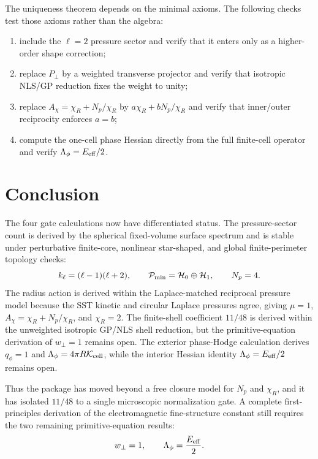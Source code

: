 \documentclass[11pt]{article}
\newcommand{\Eeff}{E_{\rm eff}}
\begin{document}
The uniqueness theorem depends on the minimal axioms.  The following checks
test those axioms rather than the algebra:
\begin{enumerate}
\item include the \(\ell=2\) pressure sector and verify that it enters only as a
higher-order shape correction;
\item replace \(P_\perp\) by a weighted transverse projector and verify that
isotropic NLS/GP reduction fixes the weight to unity;
\item replace \(A_\chi=\chi_R+N_p/\chi_R\) by
\(a\chi_R+bN_p/\chi_R\) and verify that inner/outer reciprocity enforces
\(a=b\);
\item compute the one-cell phase Hessian directly from the full finite-cell
operator and verify \(\Lambda_\phi=\Eeff/2\).
\end{enumerate}

\section{Conclusion}

The four gate calculations now have differentiated status.  The pressure-sector
count is derived by the spherical fixed-volume surface spectrum and is stable
under perturbative finite-core, nonlinear star-shaped, and global
finite-perimeter topology checks:
\[
  k_\ell=(\ell-1)(\ell+2),
  \qquad
  \mathcal P_{\rm min}=\mathcal H_0\oplus\mathcal H_1,
  \qquad
  N_p=4.
\]
The radius action is derived within the Laplace-matched reciprocal pressure
model because the SST kinetic and circular Laplace pressures agree, giving
\(\mu=1\), \(A_\chi=\chi_R+N_p/\chi_R\), and \(\chi_R=2\).  The finite-shell
coefficient \(11/48\) is derived within the unweighted isotropic GP/NLS shell
reduction, but the primitive-equation derivation of \(w_\perp=1\) remains open.
The exterior phase-Hodge calculation derives \(q_\phi=1\) and
\(\Lambda_\phi=4\pi R\mathcal K_{\rm cell}\), while the interior Hessian
identity \(\Lambda_\phi=E_{\rm eff}/2\) remains open.

Thus the package has moved beyond a free closure model for \(N_p\) and
\(\chi_R\), and it has isolated \(11/48\) to a single microscopic normalization
gate.  A complete first-principles derivation of the electromagnetic
fine-structure constant still requires the two remaining primitive-equation
results:
\[
  w_\perp=1,
  \qquad
  \Lambda_\phi=\frac{E_{\rm eff}}{2}.
\]
\end{document}
